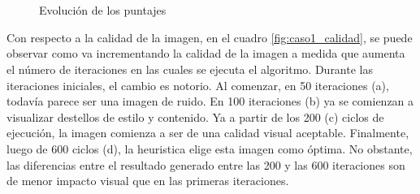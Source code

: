 \documentclass[a4paper,11pt,spanish]{book}
\begin{document}
	\begin{figure}[H]
	  \begin{center}
	    \\
	    \\
	  \end{center}
	  \caption{Evolución de los puntajes}
	  \label{fig:puntajes_caso1}
	\end{figure}
	
	Con respecto a la calidad de la imagen, en el cuadro \ref{fig:caso1_calidad}, se puede observar como va incrementando la calidad de la imagen a medida que aumenta el número
	de iteraciones en las cuales se ejecuta el algoritmo. 
	Durante las iteraciones iniciales, el cambio es notorio. Al comenzar, en 50 iteraciones (a), todavía parece ser una imagen de ruido. 
	En 100 iteraciones (b) ya se comienzan a visualizar destellos de estilo y contenido. Ya a partir de los 200 (c) ciclos de ejecución, la imagen comienza a ser de una calidad visual aceptable.
	Finalmente, luego de 600 ciclos (d), la heuristica elige esta imagen como óptima. No obstante, las diferencias entre el resultado generado entre las 200 y las 600 iteraciones
	son de menor impacto visual que en las primeras iteraciones.
	
\end{document}
